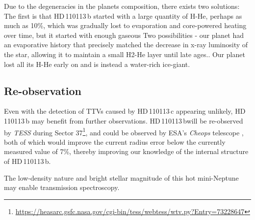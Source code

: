 \documentclass[fleqn,usenatbib]{mnras}
\newcommand{\tess}{{\it TESS}}
\newcommand{\Tplanet}{HD\,110113\,b}
\newcommand{\Tplanetc}{HD\,110113\,c}
\begin{document}
Due to the degeneracies in the planets composition, there exists two solutions:
The first is that \Tplanet{} started with a large quantity of H-He, perhaps as much as 10\%, which was gradually lost to evaporation and core-powered heating over time, but it started with enough gaseous 
Two possibilities - our planet had an evaporative history that precisely matched the decrease in x-ray luminosity of the star, allowing it to maintain a small H2-He layer until late ages..
Our planet lost all its H-He early on and is instead a water-rich ice-giant.

\subsection{Re-observation}
Even with the detection of TTVs caused by \Tplanetc{} appearing unlikely, \Tplanet{} may benefit from further observations.
\Tplanet will be re-observed by \tess{} during Sector 37\footnote{\url{https://heasarc.gsfc.nasa.gov/cgi-bin/tess/webtess/wtv.py?Entry=73228647}}, and could be observed by ESA's \textit{Cheops} telescope \citep{benz2020cheops}, both of which would improve the current radius error below the currently measured value of 7\%, thereby improving our knowledge of the internal structure of \Tplanet{}.

The low-density nature and bright stellar magnitude of this hot mini-Neptune may enable transmission spectroscopy.
\end{document}
